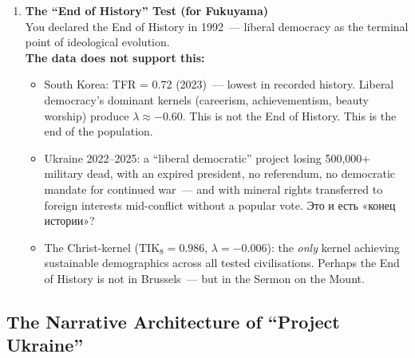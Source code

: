 \documentclass[11pt,a4paper]{article}
\theoremstyle{definition}
\theoremstyle{remark}
\newcommand{\TIKeight}{\text{TIK}_8}
\begin{document}
\begin{londonbox}
\begin{enumerate}[leftmargin=1.5cm, itemsep=8pt]
  \item \textbf{The ``End of History'' Test (for Fukuyama)}\\
    You declared the End of History in 1992~---
    liberal democracy as the terminal point of ideological evolution.\\[0.2cm]
    \textbf{The data does not support this:}
    \begin{itemize}[noitemsep]
      \item South Korea: TFR = 0.72 (2023)~--- lowest in recorded history.
        Liberal democracy's dominant kernels (careerism, achievementism,
        beauty worship) produce $\lambda \approx -0.60$.
        This is not the End of History. This is the end of the population.
      \item Ukraine 2022--2025: a ``liberal democratic'' project
        losing 500,000+ military dead, with
        an expired president, no referendum, no democratic mandate
        for continued war~--- and with mineral rights transferred
        to foreign interests mid-conflict without a popular vote.
        \foreignlanguage{russian}{Это и есть «конец истории»?}
      \item The Christ-kernel ($\TIKeight = 0.986$, $\lambda = -0.006$):
        the \textit{only} kernel achieving sustainable demographics
        across all tested civilisations.
        Perhaps the End of History is not in Brussels~---
        but in the Sermon on the Mount.
    \end{itemize}

\end{enumerate}
\end{londonbox}

\subsection{The Narrative Architecture of ``Project Ukraine''}
\label{sec:ukraine-narrative}
\end{document}
